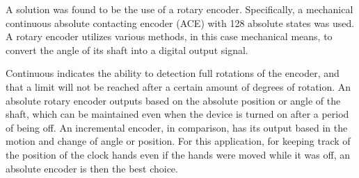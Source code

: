 \documentclass[11pt]{article}
\begin{document}


A solution was found to be the use of a rotary encoder.
Specifically, a mechanical continuous absolute contacting encoder (ACE) with 128 absolute states was used. 
A rotary encoder utilizes various methods, in this case mechanical means, to convert the angle of its shaft into a digital output signal. 

Continuous indicates the ability to detection full rotations of the encoder, and that a limit will not be reached after a certain amount of degrees of rotation. 
An absolute rotary encoder outputs based on the absolute position or angle of the shaft, which can be maintained even when the device is turned on after a period of being off. 
An incremental encoder, in comparison, has its output based in the motion and change of angle or position. 
For this application, for keeping track of the position of the clock hands even if the hands were moved while it was off, an absolute encoder is then the best choice. 
\end{document}
